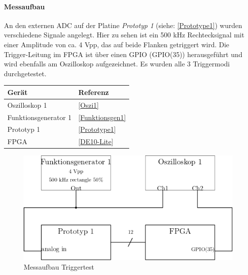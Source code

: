 \paragraph{Messaufbau}
An den externen ADC auf der Platine \textit{Prototyp 1} (siehe: \ref{Prototype1}) wurden verschiedene Signale angelegt. Hier zu sehen ist ein 500 kHz Rechtecksignal mit einer Amplitude von ca. 4 Vpp, das auf beide Flanken getriggert wird. Die Trigger-Leitung im FPGA ist über einen GPIO (GPIO(35)) herausgeführt und wird ebenfalls am Oszilloskop aufgezeichnet. Es wurden alle 3 Triggermodi durchgetestet.
\begin{center}
\begin{tabular}{l|l}
	Gerät & Referenz\\
	\hline \hline
	Oszilloskop 1 & \ref{Oszi1}\\
	\hline
	Funktionsgenerator 1 & \ref{Funktionsgen1}\\
	\hline
	Prototyp 1 & \ref{Prototype1}\\
	\hline
	FPGA & \ref{DE10-Lite}\\
\end{tabular}
\end{center}
\begin{figure}[h]
	\begin{center}
		\includegraphics[width=12cm]{SAUER/Grafiken/Trigger/Messaufbau.png}
		\caption{Messaufbau Triggertest}
		\label{Messaufbau_Trigger}
	\end{center}
\end{figure}
